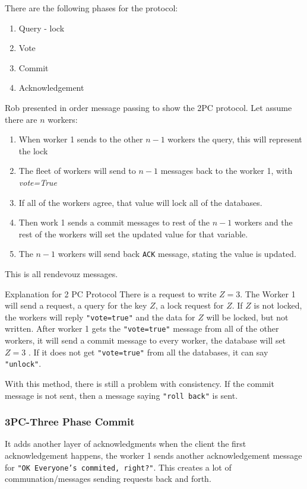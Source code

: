 \vspace{0.5em}
There are the following phases for the protocol:
\begin{enumerate}[, noitemsep, topsep=1pt]
\item Query - lock
\item Vote
\item Commit
\item Acknowledgement
\end{enumerate}
\vspace{0.5em}
Rob presented in order message passing to show the 2PC protocol. Let assume there are $n$ workers:
\begin{enumerate}[noitemsep, topsep=2pt]
\item When worker 1 sends to the other $n - 1$ workers the query, this will represent the lock
\item The fleet of workers will send to $n - 1$ messages back to the worker 1, with \textit{vote=True}
\item If all of the workers agree, that value will lock all of the databases.
\item Then work 1 sends a commit messages to rest of the $n-1$ workers and the rest of the workers will set the updated value for that variable. 
\item The $n-1$ workers will send back \texttt{ACK} message, stating the value is updated.
\end{enumerate}
This is all rendevouz messages. 

\begin{example}{Explanation for 2 PC Protocol}
There is a request to write 
$Z = 3$. The Worker 1 will send a request, a query for the key $Z$, a lock request for $Z$. If $Z$ is not locked, the workers will reply \texttt{"vote=true"} and the data for $Z$ will be locked, but not written. After worker 1 gets the \texttt{"vote=true"} message from all of the other workers, it will send a commit message to every worker, the database will set  $Z=3$ . If it does not get \texttt{"vote=true"} from all the databases, it can say \texttt{"unlock"}.
\end{example}

With this method, there is still a problem with consistency. If the commit message is not sent, then a message saying \texttt{"roll back"} is sent.

\subsubsection{3PC-Three Phase Commit}
It adds another layer of acknowledgments when the client the first acknowledgement happens, the worker 1 sends another acknowledgement message for \texttt{"OK Everyone's commited, right?"}. This creates a lot of communation/messages sending requests back and forth.

